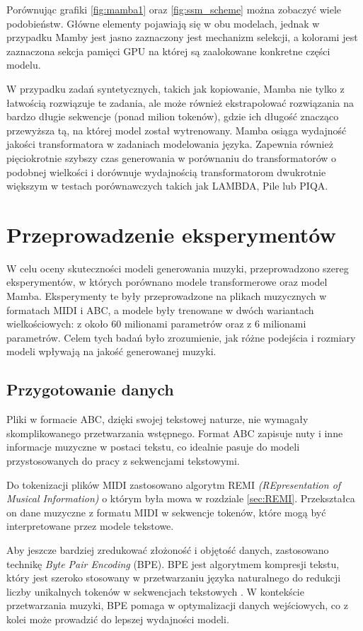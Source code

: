\documentclass[data-science]{agh-wi} %
\begin{document}
Porównując grafiki \ref*{fig:mamba1} oraz \ref*{fig:ssm_scheme} można zobaczyć wiele podobieństw. Główne elementy pojawiają się w obu modelach, jednak w przypadku Mamby jest jasno zaznaczony jest mechanizm selekcji, a kolorami jest zaznaczona sekcja pamięci GPU na której są zaalokowane konkretne części modelu.

W przypadku zadań syntetycznych, takich jak kopiowanie, Mamba nie tylko z łatwością rozwiązuje te zadania, ale może również ekstrapolować rozwiązania na bardzo długie sekwencje (ponad milion tokenów), gdzie ich długość znacząco przewyższa tą, na której model został wytrenowany. Mamba osiąga wydajność jakości transformatora w zadaniach modelowania języka. Zapewnia również pięciokrotnie szybszy czas generowania w porównaniu do transformatorów o podobnej wielkości i dorównuje wydajnością transformatorom dwukrotnie większym w testach porównawczych takich jak LAMBDA, Pile lub PIQA.

\chapter{Przeprowadzenie eksperymentów}
W celu oceny skuteczności modeli generowania muzyki, przeprowadzono szereg eksperymentów, w których porównano modele transformerowe oraz model Mamba. Eksperymenty te były przeprowadzone na plikach muzycznych w formatach MIDI i ABC, a modele były trenowane w dwóch wariantach wielkościowych: z około 60 milionami parametrów oraz z 6 milionami parametrów. Celem tych badań było zrozumienie, jak różne podejścia i rozmiary modeli wpływają na jakość generowanej muzyki.

\section{Przygotowanie danych}
Pliki w formacie ABC, dzięki swojej tekstowej naturze, nie wymagały skomplikowanego przetwarzania wstępnego. Format ABC zapisuje nuty i inne informacje muzyczne w postaci tekstu, co idealnie pasuje do modeli przystosowanych do pracy z sekwencjami tekstowymi.

Do tokenizacji plików MIDI zastosowano algorytm REMI \textit{(REpresentation of Musical Information)} o którym była mowa w rozdziale \ref*{sec:REMI}. Przekształca on dane muzyczne z formatu MIDI w sekwencje tokenów, które mogą być interpretowane przez modele tekstowe.

Aby jeszcze bardziej zredukować złożoność i objętość danych, zastosowano technikę \textit{Byte Pair Encoding} (BPE). BPE jest algorytmem kompresji tekstu, który jest szeroko stosowany w przetwarzaniu języka naturalnego do redukcji liczby unikalnych tokenów w sekwencjach tekstowych \cite{bpe}. W kontekście przetwarzania muzyki, BPE pomaga w optymalizacji danych wejściowych, co z kolei może prowadzić do lepszej wydajności modeli.
\end{document}
